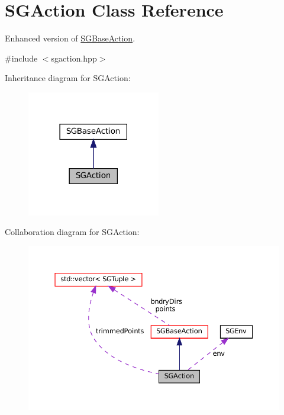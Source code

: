 \hypertarget{classSGAction}{}\section{S\+G\+Action Class Reference}
\label{classSGAction}


Enhanced version of \hyperlink{classSGBaseAction}{S\+G\+Base\+Action}.  




{\ttfamily \#include $<$sgaction.\+hpp$>$}



Inheritance diagram for S\+G\+Action\+:
\nopagebreak
\begin{figure}[H]
\begin{center}
\leavevmode
\includegraphics[width=165pt]{classSGAction__inherit__graph}
\end{center}
\end{figure}


Collaboration diagram for S\+G\+Action\+:
\nopagebreak
\begin{figure}[H]
\begin{center}
\leavevmode
\includegraphics[width=350pt]{classSGAction__coll__graph}
\end{center}
\end{figure}
